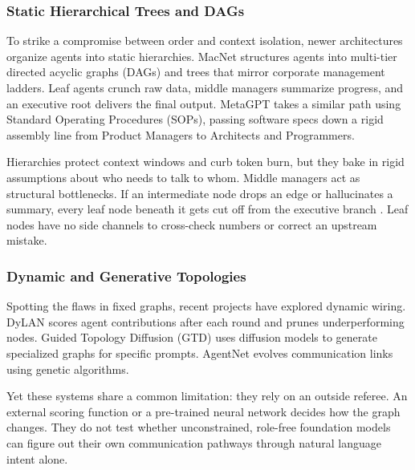 \documentclass{ieeeaccess}
\begin{document}
\subsubsection{Static Hierarchical Trees and DAGs}
To strike a compromise between order and context isolation, newer architectures organize agents into static hierarchies. MacNet \cite{wang2025macnet} structures agents into multi-tier directed acyclic graphs (DAGs) and trees that mirror corporate management ladders. Leaf agents crunch raw data, middle managers summarize progress, and an executive root delivers the final output. MetaGPT \cite{hong2024metagpt} takes a similar path using Standard Operating Procedures (SOPs), passing software specs down a rigid assembly line from Product Managers to Architects and Programmers.

Hierarchies protect context windows and curb token burn, but they bake in rigid assumptions about who needs to talk to whom. Middle managers act as structural bottlenecks. If an intermediate node drops an edge or hallucinates a summary, every leaf node beneath it gets cut off from the executive branch \cite{ruan2025mast}. Leaf nodes have no side channels to cross-check numbers or correct an upstream mistake.

\subsubsection{Dynamic and Generative Topologies}
Spotting the flaws in fixed graphs, recent projects have explored dynamic wiring. DyLAN \cite{liu2024dylan} scores agent contributions after each round and prunes underperforming nodes. Guided Topology Diffusion (GTD) \cite{zhang2026topologydiffusion} uses diffusion models to generate specialized graphs for specific prompts. AgentNet \cite{li2025agentnet} evolves communication links using genetic algorithms.

Yet these systems share a common limitation: they rely on an outside referee. An external scoring function or a pre-trained neural network decides how the graph changes. They do not test whether unconstrained, role-free foundation models can figure out their own communication pathways through natural language intent alone.
\end{document}
